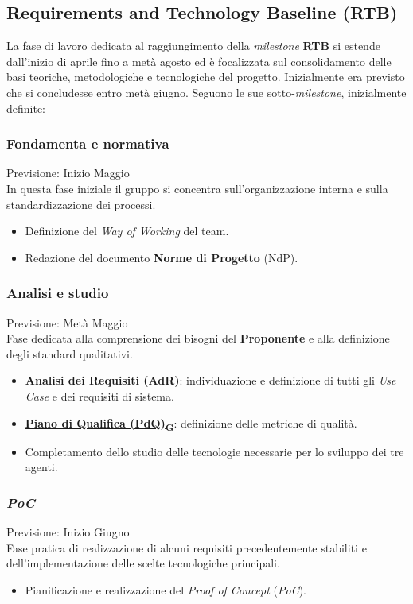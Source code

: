 \documentclass[12pt, a4paper]{article}
\newcommand{\urlglossario}{https://skynetunigroup.github.io/Code_Guardian/Documentazione/RTB/glossario_v1.0.0.pdf} %
\newcommand{\glo}[2]{\href{\urlglossario\#nameddest=#2}{#1\textsubscript{G}}}
\begin{document}
{\subsection{Requirements and Technology Baseline (\textbf{RTB})}
La fase di lavoro dedicata al raggiungimento della \textit{milestone} \textbf{RTB} si estende dall'inizio di aprile fino a metà agosto ed è focalizzata sul consolidamento delle basi teoriche, metodologiche e tecnologiche del progetto. Inizialmente era previsto che si concludesse entro metà giugno. Seguono le sue sotto-\textit{milestone}, inizialmente definite:

\subsubsection{Fondamenta e normativa}
Previsione: Inizio Maggio \\
In questa fase iniziale il gruppo si concentra sull'organizzazione interna e sulla standardizzazione dei processi.
\begin{itemize}
    \item Definizione del \textit{Way of Working} del team.
    \item Redazione del documento \textbf{Norme di Progetto} (NdP).
\end{itemize}


\subsubsection{Analisi e studio}
Previsione: Metà Maggio \\
Fase dedicata alla comprensione dei bisogni del \textbf{Proponente} e alla definizione degli standard qualitativi.
\begin{itemize}
    \item \textbf{Analisi dei Requisiti (AdR)}: individuazione e definizione di tutti gli \textit{Use Case} e dei requisiti di sistema.
    \item \textbf{\glo{Piano di Qualifica (PdQ)}{piano-di-qualifica}}: definizione delle metriche di qualità.
    \item Completamento dello studio delle tecnologie necessarie per lo sviluppo dei tre agenti.
\end{itemize}



\subsubsection{\textit{PoC}}
Previsione: Inizio Giugno \\
Fase pratica di realizzazione di alcuni requisiti precedentemente stabiliti e dell'implementazione delle scelte tecnologiche principali.
\begin{itemize}
    \item Pianificazione e realizzazione del \textit{Proof of Concept} (\textit{PoC}).
\end{itemize}

}
\end{document}
